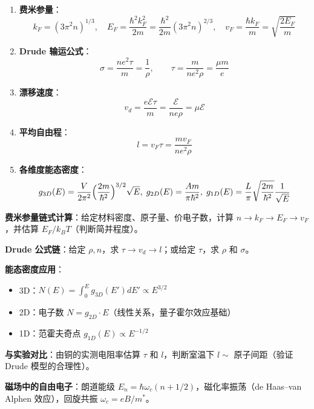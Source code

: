 \begin{formulabox}[核心公式]
\begin{enumerate}[label=\textbf{(\arabic*)}]
    \item \textbf{费米参量}：
    \[
    k_F=(3\pi^2 n)^{1/3},\quad
    E_F=\frac{\hbar^2k_F^2}{2m}=\frac{\hbar^2}{2m}(3\pi^2 n)^{2/3},\quad
    v_F=\frac{\hbar k_F}{m}=\sqrt{\frac{2E_F}{m}}
    \]

    \item \textbf{Drude 输运公式}：
    \[
    \sigma=\frac{ne^2\tau}{m}=\frac{1}{\rho},\qquad
    \tau=\frac{m}{ne^2\rho}=\frac{\mu m}{e}
    \]

    \item \textbf{漂移速度}：
    \[
    v_d=\frac{e\mathcal{E}\tau}{m}=\frac{\mathcal{E}}{ne\rho}=\mu\mathcal{E}
    \]

    \item \textbf{平均自由程}：
    \[
    l=v_F\tau=\frac{m v_F}{ne^2\rho}
    \]

    \item \textbf{各维度能态密度}：
    \[
    g_{3D}(E)=\frac{V}{2\pi^2}\Bigl(\frac{2m}{\hbar^2}\Bigr)^{3/2}\sqrt{E},\;
    g_{2D}(E)=\frac{Am}{\pi\hbar^2},\;
    g_{1D}(E)=\frac{L}{\pi}\sqrt{\frac{2m}{\hbar^2}}\frac{1}{\sqrt{E}}
    \]
\end{enumerate}
\end{formulabox}

\begin{drillbox}[训练点与考法变体]
 \textbf{费米参量链式计算}：给定材料密度、原子量、价电子数，计算 $n\to k_F\to E_F\to v_F$，并估算 $E_F/k_BT$（判断简并程度）。

 \textbf{Drude 公式链}：给定 $\rho, n$，求 $\tau\to v_d\to l$；或给定 $\tau$，求 $\rho$ 和 $\sigma$。

 \textbf{能态密度应用}：
\begin{itemize}[nosep]
    \item 3D：$N(E)=\int_0^E g_{3D}(E')dE'\propto E^{3/2}$
    \item 2D：电子数 $N=g_{2D}\cdot E$（线性关系，量子霍尔效应基础）
    \item 1D：范霍夫奇点 $g_{1D}(E)\propto E^{-1/2}$
\end{itemize}

 \textbf{与实验对比}：由铜的实测电阻率估算 $\tau$ 和 $l$，判断室温下 $l\sim$ 原子间距（验证 Drude 模型的合理性）。

 \textbf{磁场中的自由电子}：朗道能级 $E_n=\hbar\omega_c(n+1/2)$，磁化率振荡（de Haas--van Alphen 效应），回旋共振 $\omega_c=eB/m^*$。
\end{drillbox}

